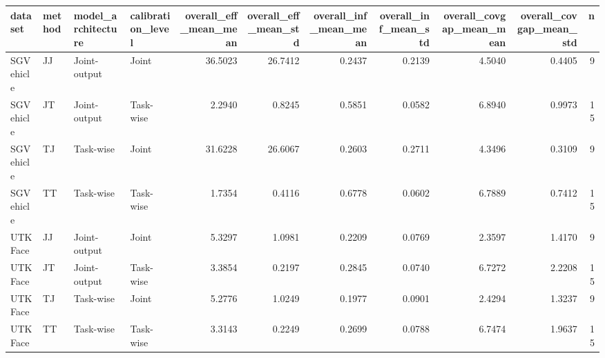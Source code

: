\begin{tabular}{llllrrrrrrr}
\toprule
dataset & method & model_architecture & calibration_level & overall_eff_mean_mean & overall_eff_mean_std & overall_inf_mean_mean & overall_inf_mean_std & overall_covgap_mean_mean & overall_covgap_mean_std & n \\
\midrule
SGVehicle & JJ & Joint-output & Joint & 36.5023 & 26.7412 & 0.2437 & 0.2139 & 4.5040 & 0.4405 & 9 \\
SGVehicle & JT & Joint-output & Task-wise & 2.2940 & 0.8245 & 0.5851 & 0.0582 & 6.8940 & 0.9973 & 15 \\
SGVehicle & TJ & Task-wise & Joint & 31.6228 & 26.6067 & 0.2603 & 0.2711 & 4.3496 & 0.3109 & 9 \\
SGVehicle & TT & Task-wise & Task-wise & 1.7354 & 0.4116 & 0.6778 & 0.0602 & 6.7889 & 0.7412 & 15 \\
UTKFace & JJ & Joint-output & Joint & 5.3297 & 1.0981 & 0.2209 & 0.0769 & 2.3597 & 1.4170 & 9 \\
UTKFace & JT & Joint-output & Task-wise & 3.3854 & 0.2197 & 0.2845 & 0.0740 & 6.7272 & 2.2208 & 15 \\
UTKFace & TJ & Task-wise & Joint & 5.2776 & 1.0249 & 0.1977 & 0.0901 & 2.4294 & 1.3237 & 9 \\
UTKFace & TT & Task-wise & Task-wise & 3.3143 & 0.2249 & 0.2699 & 0.0788 & 6.7474 & 1.9637 & 15 \\
\bottomrule
\end{tabular}
